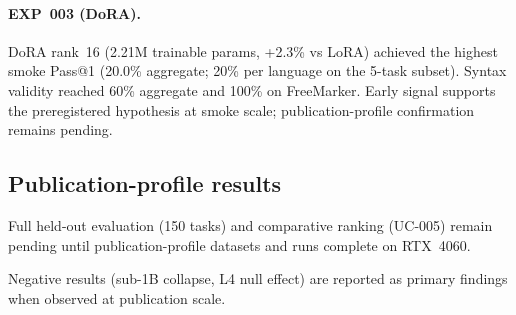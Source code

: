 

\paragraph{EXP~003 (DoRA).}
DoRA rank~16 (2.21M trainable params, +2.3\% vs LoRA) achieved the highest smoke Pass@1
(20.0\% aggregate; 20\% per language on the 5-task subset).
Syntax validity reached 60\% aggregate and 100\% on FreeMarker.
Early signal supports the preregistered hypothesis at smoke scale; publication-profile confirmation
remains pending.

\subsection{Publication-profile results}

Full held-out evaluation (150 tasks) and comparative ranking (UC-005) remain pending until
publication-profile datasets and runs complete on RTX~4060.

Negative results (sub-1B collapse, L4 null effect) are reported as primary findings when observed
at publication scale.
